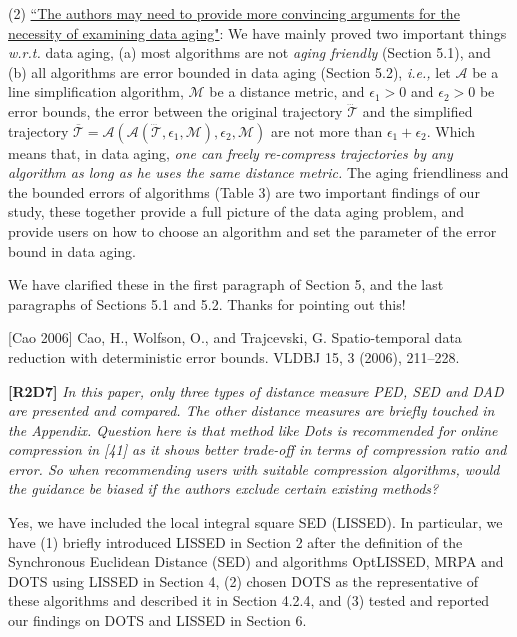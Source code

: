 \documentclass{letter}
\newcommand{\ie}{\emph{i.e.,}\xspace}
\newcommand{\wrt}{\emph{w.r.t.}\xspace}
\begin{document}
(2) \underline{``The authors may need to provide more convincing arguments for the necessity of examining data aging"}: We have mainly proved two important things \wrt data aging, (a) most algorithms are not \emph{aging friendly} (Section 5.1), and (b) all algorithms are error bounded in data aging (Section 5.2), \ie let $\mathcal{A}$ be a line simplification algorithm,  $\mathcal{M}$ be a distance metric, and $\epsilon_1>0$ and $\epsilon_2>0$ be error bounds, the error between the original trajectory $\dddot{\mathcal{T}}$ and the simplified trajectory $\overline{\mathcal{T}}=\mathcal{A}(\mathcal{A}(\dddot{\mathcal{T}}, \epsilon_1, \mathcal{M}), \epsilon_2, \mathcal{M})$ are not more than $\epsilon_1+ \epsilon_2$. Which means that, in data aging, \emph{one can freely re-compress trajectories by any algorithm as long as he uses the same distance metric.} The aging friendliness and the bounded errors of algorithms (Table 3) are two important findings of our study, these together provide a full picture of the data aging problem, and provide users on how to choose an algorithm and set the parameter of the error bound in data aging.

We have clarified these in the first paragraph of Section 5, and the last paragraphs of Sections 5.1 and 5.2. Thanks for pointing out this!

[Cao 2006] Cao, H., Wolfson, O., and Trajcevski, G. Spatio-temporal data reduction with deterministic error bounds. VLDBJ 15, 3 (2006), 211--228.


\textbf{[R2D7]} \emph{In this paper, only three types of distance measure PED, SED and DAD are presented and compared. The other distance measures are briefly touched in the Appendix. Question here is that method like Dots is recommended for online compression in [41] as it shows better trade-off in terms of compression ratio and error. So when recommending users with suitable compression algorithms, would the guidance be biased if the authors exclude certain existing methods?}

Yes, we have included the local integral square SED (LISSED). %
In particular, we have (1) briefly introduced LISSED in Section 2 after the definition of the Synchronous Euclidean Distance (SED) and algorithms OptLISSED, MRPA and DOTS using LISSED in Section 4,   (2) chosen DOTS as the representative of these algorithms and described it in Section 4.2.4, and (3) tested and reported our findings on DOTS and LISSED in Section 6.
\end{document}
